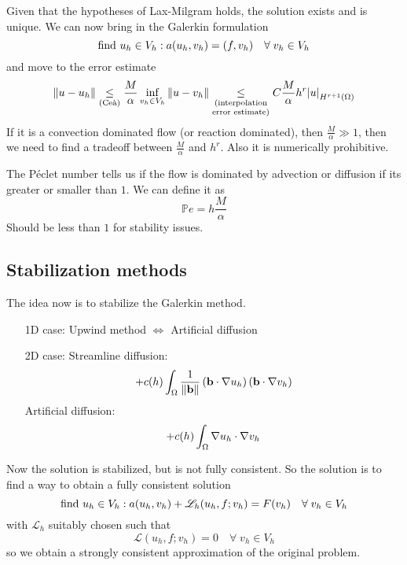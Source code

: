 Given that the hypotheses of Lax-Milgram holds, the solution exists and is unique. We can now bring in the Galerkin formulation
\[
    \text{find }u_h \in V_h : a(u_h, v_h) = (f,v_h) \quad \forall \; v_h \in V_h
\]
and move to the error estimate 
\[
    \norm{u-u_h} \underset{(\text{Ceà})}{\leq} \frac{M}{\alpha} \inf_{v_h \in V_h} \norm{u-v_h} \underset{\substack{(\text{interpolation} \\\text{error estimate})}}{\leq} C \frac{M}{\alpha} h^r \abs{u}_{H^{r+1}(\Omega)}
\]
If it is a convection dominated flow (or reaction dominated), then \(\frac{M}{\alpha} \gg 1\), then we need to find a tradeoff between \(\frac{M}{\alpha}\) and \(h^r\). Also it is numerically prohibitive. 

The Péclet number tells us if the flow is dominated by advection or diffusion if its greater or smaller than \(1\). We can define it as 
\[
    \mathbb{P}e = h\frac{M}{\alpha}
\]
Should be less than \(1\) for stability issues.
\subsection{Stabilization methods}
The idea now is to stabilize the Galerkin method. 
\begin{itemize}
    \item[1D case:] Upwind method \(\iff\) Artificial diffusion
    \item[2D case:] Streamline diffusion: 
    \[
        +c(h) \int_\Omega \frac{1}{\norm{\textbf{b}}} \left( \textbf{b} \cdot \nabla u_h \right) \left( \textbf{b} \cdot \nabla v_h \right)
    \]
    Artificial diffusion: 
    \[
        +c(h)\int_\Omega \nabla u_h \cdot \nabla v_h 
    \]
\end{itemize}
Now the solution is stabilized, but is not fully consistent. So the solution is to find a way to obtain a fully consistent solution 
\[
    \text{find } u_h \in V_h : a(u_h, v_h) + \mathscr{L}_h (u_h, f; v_h) = F(v_h) \quad \forall \; v_h \in V_h
\]
with \(\mathscr{L}_h\) suitably chosen such that
\[
    \mathscr{L}(u_h, f; v_h) = 0 \quad \forall \; v_h \in V_h
\]
so we obtain a strongly consistent approximation of the original problem.

